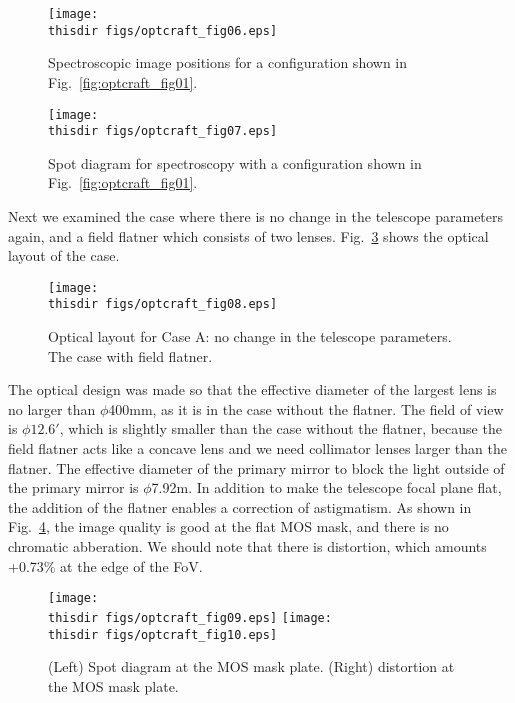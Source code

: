 \begin{figure}[!ht]
\centerline{
\texttt{[image: \\thisdir figs/optcraft\_fig06.eps]}
}
\caption{Spectroscopic image positions for a configuration shown in Fig.~\ref{fig:optcraft_fig01}.
}
\label{fig:optcraft_fig06}
\end{figure}

\begin{figure}[!ht]
\centerline{
\texttt{[image: \\thisdir figs/optcraft\_fig07.eps]}
}
\caption{Spot diagram for spectroscopy with a configuration shown in
 Fig.~\ref{fig:optcraft_fig01}.}
\label{fig:optcraft_fig07}
\end{figure}

Next we examined the case where there is no change in the telescope
parameters again, and a field flatner which consists of two lenses. 
Fig.~\ref{fig:optcraft_fig08} shows the optical layout of the case.

\begin{figure}[!ht]
\centerline{
\texttt{[image: \\thisdir figs/optcraft\_fig08.eps]}
}
\caption{Optical layout for Case A: no change in the telescope
 parameters. The case with field flatner.
}
\label{fig:optcraft_fig08}
\end{figure}

The optical design was made so that the effective diameter of the
largest lens is no larger than $\phi$400mm, as it is in the case without
the flatner. The field of view is $\phi 12.6'$, which is slightly
smaller than the case without the flatner, because the field flatner
acts like a concave lens and we need collimator lenses larger than the
flatner. The effective diameter of the primary mirror to block the light
outside of the primary mirror is $\phi$7.92m.
In addition to make the telescope focal plane flat, the addition of the
flatner enables a correction of astigmatism. As shown in 
Fig.~\ref{fig:optcraft_fig09}, the image quality is good at the flat MOS
mask, and there is no chromatic abberation.
We should note that there is distortion, which amounts +0.73\% at the
edge of the FoV.

\begin{figure}[!ht]
\centerline{
\texttt{[image: \\thisdir figs/optcraft\_fig09.eps]}
 \texttt{[image: \\thisdir figs/optcraft\_fig10.eps]}
}
\caption{(Left) Spot diagram at the MOS mask plate.
(Right) distortion at the MOS mask plate.
}
\label{fig:optcraft_fig09}
\end{figure}

